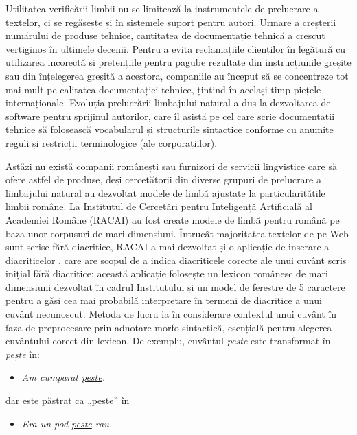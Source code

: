 \documentclass[]{../../metanetpaper}
\begin{document}
\begin{multicols}{2}
Utilitatea verificării limbii nu se limitează la instrumentele de prelucrare a textelor, ci se regăsește și în sistemele suport pentru autori. Urmare a creșterii numărului de produse tehnice, cantitatea de documentație tehnică a crescut vertiginos în ultimele decenii. Pentru a evita reclamațiile clienților în legătură cu utilizarea incorectă și pretențiile pentru pagube rezultate din instrucțiunile greșite sau din înțelegerea greșită a acestora, companiile au început să se concentreze tot mai mult pe calitatea documentației tehnice, țintind în același timp piețele internaționale. Evoluția prelucrării limbajului natural a dus la dezvoltarea de software pentru sprijinul autorilor, care îl asistă pe cel care scrie documentații tehnice să folosească vocabularul și structurile sintactice conforme cu anumite reguli și restricții terminologice (ale corporațiilor).

Astăzi nu există companii românești sau furnizori de servicii lingvistice care să ofere astfel de produse, deși cercetătorii din diverse grupuri de prelucrare a limbajului natural au dezvoltat modele de limbă ajustate la particularitățile limbii române. La Institutul de Cercetări pentru Inteligență Artificială al Academiei Române (RACAI) au fost create modele de limbă pentru română pe baza unor corpusuri de mari dimensiuni. Întrucât majoritatea textelor de pe Web sunt scrise fără diacritice, RACAI a mai dezvoltat și o aplicație de inserare a diacriticelor \cite{DIAC}, care are scopul de a indica diacriticele corecte ale unui cuvânt scris inițial fără diacritice; această aplicație folosește un lexicon românesc de mari dimensiuni dezvoltat în cadrul Institutului și un model de ferestre de 5 caractere pentru a găsi cea mai probabilă interpretare în termeni de diacritice a unui cuvânt necunoscut. Metoda de lucru ia în considerare contextul unui cuvânt în faza de preprocesare prin adnotare morfo-sintactică, esențială pentru alegerea cuvântului corect din lexicon. De exemplu, cuvântul \textit{peste} este transformat în \textit{pește} în:

\begin{itemize}
\item \textit{Am cumparat \underline{peste}.}
\end{itemize}

dar este păstrat ca „peste” în

\begin{itemize}
\item \textit{Era un pod \underline{peste} rau. }
\end{itemize}


\end{multicols}
\end{document}
